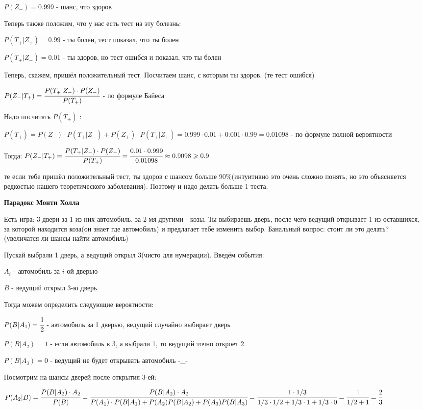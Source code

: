 \documentclass[a4paper]{article}
\begin{document}
\begin{colloq}
	$P(Z_-) = 0.999$ - шанс,  что здоров
	
	Теперь также положим, что у нас есть тест на эту болезнь:
	
	$P(T_+ | Z_+) = 0.99$ - ты болен, тест показал,  что ты болен
	
	$P(T_+ | Z_-) = 0.01$ - ты здоров, но тест ошибся и показал, что ты болен
	
	Теперь, скажем, пришёл положительный тест. Посчитаем шанс, с которым ты здоров. (те тест ошибся)
	
	$P(Z_- | T_+) = \cfrac{P(T_+ | Z_-) \cdot P(Z_-)}{P(T_+)}$ - по формуле Байеса
	
	Надо посчитать $P(T_+)$ :
	
	$P(T_+) = P(Z_-) \cdot P(T_+ | Z_-) + P(Z_+) \cdot P(T_+ | Z_+) = 0.999 \cdot 0.01 + 0.001 \cdot 0.99 = 0.01098$ - по формуле полной вероятности
	
	Тогда: $P(Z_- | T_+) = \cfrac{P(T_+ | Z_-) \cdot P(Z_-)}{P(T_+)}  = \cfrac{0.01 \cdot 0.999}{0.01098} \approx 0.9098 \geq 0.9$ 
	
	те если тебе пришёл положительный тест, ты здоров с шансом больше $90\%$(интуитивно это очень сложно понять, но это объясняется редкостью нашего теоретического заболевания). Поэтому и надо делать больше 1 теста.
	
	\textbf{Парадокс Монти Холла}
	
	Есть игра: 3 двери за 1 из них автомобиль, за 2-мя другими - козы. Ты выбираешь дверь, после чего ведущий открывает 1 из оставшихся, за которой находится коза(он знает где автомобиль) и предлагает тебе изменить выбор. Банальный вопрос: стоит ли это делать? (увеличатся ли шансы найти автомобиль)
	
	Пускай выбрали 1 дверь, а ведущий открыл 3(чисто для нумерации). Введём события:
	
	$A_i $ - автомобиль за $i$-ой дверью 
	
	$B $ - ведущий открыл 3-ю дверь 
	
	Тогда можем определить следующие вероятности:
	
	$P(B| A_1) = \cfrac 12$ - автомобиль за 1 дверью, ведущий случайно выбирает дверь
	
	$P(B| A_2) = 1$ - если автомобиль в 3, а выбрали 1, то ведущий точно откроет 2.
	
	$P(B| A_3) = 0$ - ведущий не будет открывать автомобиль -\_-
	
	Посмотрим на шансы дверей после открытия 3-ей:
	
	$P(A_2| B) = \cfrac {P(B| A_2) \cdot A_2}{P(B)} = \cfrac {P(B| A_2) \cdot A_2}{P(A_1)\cdot P(B| A_1) + P(A_2)P(B| A_2) + P(A_3)P(B| A_3)} = \cfrac {1 \cdot 1/3}{1/3 \cdot 1/2 + 1/3 \cdot 1 + 1/3 \cdot 0} = \cfrac {1}{1/2 + 1} = \cfrac 23$
	

\end{colloq}
\end{document}

